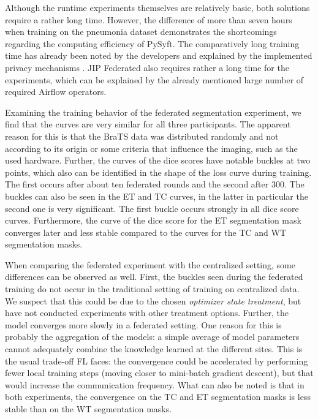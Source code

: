 Although the runtime experiments themselves are relatively basic, both solutions require a rather long time.
However, the difference of more than seven hours when training on the pneumonia dataset demonstrates the shortcomings regarding the computing efficiency of PySyft. The comparatively long training time has already been noted by the developers and explained by the implemented privacy mechanisms \citep{Ryffel2018ALearning}.
JIP Federated also requires rather a long time for the experiments, which can be explained by the already mentioned large number of required Airflow operators.



Examining the training behavior of the federated segmentation experiment,
we find that the curves are very similar for all three participants. The apparent reason for this is that the BraTS data was distributed randomly and not according to its origin or some criteria that influence the imaging, such as the used hardware.
Further, the curves of the dice scores have notable buckles at two points, which also can be identified in the shape of the loss curve during training. The first occurs after about ten federated rounds and the second after 300. The buckles can also be seen in the ET and TC curves, in the latter in particular the second one is very significant. The first buckle occurs strongly in all dice score curves.
Furthermore, the curve of the dice score for the ET segmentation mask converges later and less stable compared to the curves for the TC and WT segmentation masks.

When comparing the federated experiment with the centralized setting, some differences can be observed as well.
First, the buckles seen during the federated training do not occur in the traditional setting of training on centralized data. We suspect that this could be due to the chosen \textit{optimizer state treatment}, but have not conducted experiments with other treatment options.
Further, the model converges more slowly in a federated setting. One reason for this is probably the aggregation of the models: a simple average of model parameters cannot adequately combine the knowledge learned at the different sites. This is the usual trade-off FL faces: the convergence could be accelerated by performing fewer local training steps (moving closer to mini-batch gradient descent), but that would increase the communication frequency.
What can also be noted is that in both experiments, the convergence on the TC and ET segmentation masks is less stable than on the WT segmentation masks.

